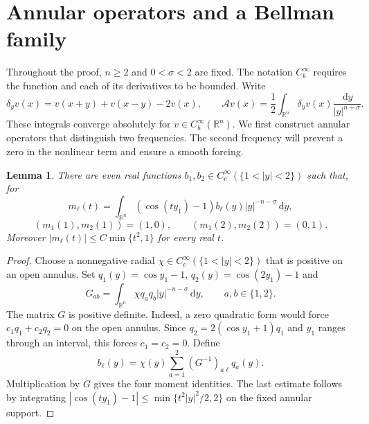 \documentclass[11pt]{article}
\newcommand{\R}{\mathbb R}
\newcommand{\dd}{\,\mathrm d}
\newcommand{\A}{\mathcal A}
\newcommand{\Cb}{C_b^\infty(\R^n)}
\newtheorem{lemma}[theorem]{Lemma}
\theoremstyle{remark}
\numberwithin{equation}{section}
\begin{document}
\section{Annular operators and a Bellman family}\label{sec:annular}
Throughout the proof, $n\ge2$ and $0<\sigma<2$ are fixed. The notation
$C_b^\infty$ requires the function and each of its derivatives to be bounded.
Write
\[
 \delta_y v(x)=v(x+y)+v(x-y)-2v(x),\qquad
 \A v(x)=\frac12\int_{\R^n}\delta_yv(x)\frac{\dd y}{|y|^{n+\sigma}}.
\]
These integrals converge absolutely for $v\in\Cb$. We first construct
annular operators that distinguish two frequencies. The second frequency
will prevent a zero in the nonlinear term and ensure a smooth forcing.

\begin{lemma}\label{lem:moments}
There are even real functions $b_1,b_2\in C_c^\infty(\{1<|y|<2\})$ such that,
for
\[
 m_\ell(t)=\int_{\R^n}(\cos(ty_1)-1)b_\ell(y)|y|^{-n-\sigma}\dd y,
\]
\[
 (m_1(1),m_2(1))=(1,0),\qquad (m_1(2),m_2(2))=(0,1).
\]
Moreover $|m_\ell(t)|\le C\min\{t^2,1\}$ for every real $t$.
\end{lemma}
\begin{proof}
Choose a nonnegative radial $\chi\in C_c^\infty(\{1<|y|<2\})$ that is
positive on an open annulus. Set $q_1(y)=\cos y_1-1$, $q_2(y)=\cos(2y_1)-1$
and
\[
 G_{ab}=\int_{\R^n}\chi q_aq_b|y|^{-n-\sigma}\dd y,\qquad a,b\in\{1,2\}.
\]
The matrix $G$ is positive definite. Indeed, a zero quadratic form would
force $c_1q_1+c_2q_2=0$ on the open annulus. Since
$q_2=2(\cos y_1+1)q_1$ and $y_1$ ranges through an interval, this forces
$c_1=c_2=0$. Define
\[
 b_\ell(y)=\chi(y)\sum_{a=1}^2(G^{-1})_{a\ell}q_a(y).
\]
Multiplication by $G$ gives the four moment identities. The last estimate
follows by integrating $|\cos(ty_1)-1|\le\min\{t^2|y|^2/2,2\}$ on the
fixed annular support.
\end{proof}
\end{document}
